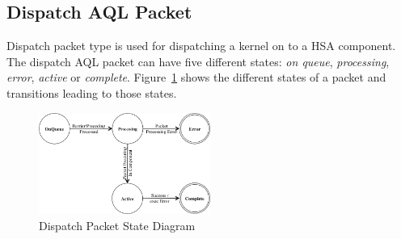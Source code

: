 \documentclass{book}
\begin{document}
\hypertarget{dispatch_packet}{}\subsection{Dispatch AQL
Packet}\label{dispatch_packet}

Dispatch packet type is used for dispatching a kernel on to a HSA
component. The dispatch AQL packet can have five different states:
\emph{on queue}, \emph{processing}, \emph{error}, \emph{active} or
\emph{complete}. Figure~\ref{fig:packetstate} shows the different
states of a packet and transitions leading to those states.

\begin{figure}
  \centering
  \includegraphics[width=0.5\textwidth] {fig/packetstate}
  \centering
  \caption{Dispatch Packet State Diagram}
  \label{fig:packetstate}
\end{figure}
\end{document}
